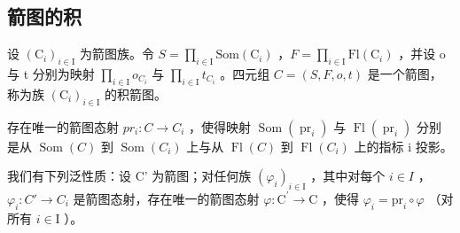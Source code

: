 \subsection{箭图的积}

设 \((\mathrm{C}_{i})_{i\in\mathrm{I}}\) 为箭图族。令 \(S = \prod_{i\in\mathrm{I}} \mathrm{Som}(\mathrm{C}_{i})\) ，\(F = \prod_{i\in\mathrm{I}} \mathrm{Fl}(\mathrm{C}_{i})\) ，并设 o 与 t 分别为映射 \(\prod_{i\in\mathrm{I}} o_{C_{i}}\) 与 \(\prod_{i\in\mathrm{I}} t_{C_{i}}\) 。四元组 \(C = (S, F, o, t)\) 是一个箭图，称为族 \((\mathrm{C}_{i})_{i\in\mathrm{I}}\) 的积箭图。

存在唯一的箭图态射 \(pr_{i}: C \to C_{i}\) ，使得映射 \(\operatorname{Som}(\operatorname{pr}_{i})\) 与 \(\operatorname{Fl}(\operatorname{pr}_{i})\) 分别是从 \(\operatorname{Som}(C)\) 到 \(\operatorname{Som}(C_{i})\) 上与从 \(\operatorname{Fl}(C)\) 到 \(\operatorname{Fl}(C_{i})\) 上的指标 i 投影。

我们有下列泛性质：设 C' 为箭图；对任何族 \((\varphi_{i})_{i\in\mathrm{I}}\) ，其中对每个 \(i\in I\) ，\(\varphi_{i}\colon C'\to C_{i}\) 是箭图态射，存在唯一的箭图态射 \(\varphi\colon\mathrm{C}^{\prime}\to\mathrm{C}\) ，使得 \(\varphi_{i}=\mathrm{pr}_{i}\circ\varphi\) （对所有 \(i\in\mathrm{I}\) ）。

